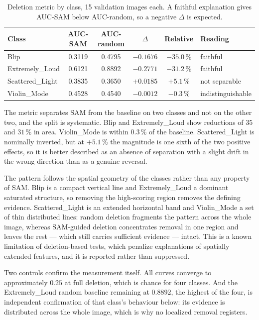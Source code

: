 \begin{table}[htbp]
\centering
\begin{tabular}{lccccl}
\toprule
Class & AUC-SAM & AUC-random & $\Delta$ & Relative & Reading \\
\midrule
Blip & 0.3119 & 0.4795 & $-0.1676$ & $-35.0$\,\% & faithful \\
Extremely\_Loud & 0.6121 & 0.8892 & $-0.2771$ & $-31.2$\,\% & faithful \\
Scattered\_Light & 0.3835 & 0.3650 & $+0.0185$ & $+5.1$\,\% & not separable \\
Violin\_Mode & 0.4528 & 0.4540 & $-0.0012$ & $-0.3$\,\% & indistinguishable \\
\bottomrule
\end{tabular}
\caption{Deletion metric by class, 15 validation images each. A faithful
explanation gives AUC-SAM below AUC-random, so a negative $\Delta$ is expected.}
\label{tab:deletion}
\end{table}

The metric separates SAM from the baseline on two classes and not on the other
two, and the split is systematic. Blip and Extremely\_Loud show reductions of
$35$ and $31$\,\% in area. Violin\_Mode is within $0.3$\,\% of the baseline.
Scattered\_Light is nominally inverted, but at $+5.1$\,\% the magnitude is one
sixth of the two positive effects, so it is better described as an absence of
separation with a slight drift in the wrong direction than as a genuine reversal.

The pattern follows the spatial geometry of the classes rather than any property
of SAM. Blip is a compact vertical line and Extremely\_Loud a dominant saturated
structure, so removing the high-scoring region removes the defining evidence.
Scattered\_Light is an extended horizontal band and Violin\_Mode a set of thin
distributed lines: random deletion fragments the pattern across the whole image,
whereas SAM-guided deletion concentrates removal in one region and leaves the
rest --- which still carries sufficient evidence --- intact. This is a known
limitation of deletion-based tests, which penalize explanations of spatially
extended features, and it is reported rather than suppressed.

Two controls confirm the measurement itself. All curves converge to
approximately $0.25$ at full deletion, which is chance for four classes. And the
Extremely\_Loud random baseline remaining at $0.8892$, the highest of the four,
is independent confirmation of that class's behaviour below: its evidence is
distributed across the whole image, which is why no localized removal registers.


